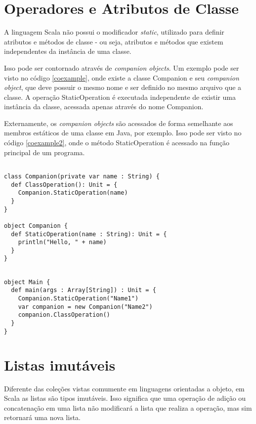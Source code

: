 \section{Operadores e Atributos de Classe}

A linguagem Scala não possui o modificador \textit{static}, 
utilizado para definir atributos e métodos de classe - 
ou seja, atributos e métodos que existem independentes 
da instância de uma classe. 

Isso pode ser contornado através de \textit{companion objects}. 
Um exemplo pode ser visto no código \ref{coexample}, onde 
existe a classe Companion e seu \textit{companion object}, que 
deve possuir o mesmo nome e ser definido no mesmo arquivo 
que a classe. A operação StaticOperation é executada 
independente de existir uma instância da classe, acessada 
apenas através do nome Companion.

Externamente, os \textit{companion objects} são acessados 
de forma semelhante aos membros estáticos de uma classe 
em Java, por exemplo. Isso pode ser visto no código 
\ref{coexample2}, onde o método StaticOperation é acessado 
na função principal de um programa.

\begin{lstlisting}[caption={Exemplo de companion object},label=coexample]

class Companion(private var name : String) {
  def ClassOperation(): Unit = {
    Companion.StaticOperation(name)
  }
}

object Companion {
  def StaticOperation(name : String): Unit = {
    println("Hello, " + name)
  }
}

\end{lstlisting}

\begin{lstlisting}[caption={Chamada de operações de um companion object},label=coexample2]

object Main {
  def main(args : Array[String]) : Unit = {
    Companion.StaticOperation("Name1")
    var companion = new Companion("Name2")
    companion.ClassOperation()
  }
}

\end{lstlisting}

\section{Listas imutáveis}

Diferente das coleções vistas comumente em linguagens 
orientadas a objeto, em Scala as listas são tipos 
imutáveis. Isso significa que uma operação de adição 
ou concatenação em uma lista não modificará a lista 
que realiza a operação, mas sim retornará uma nova 
lista\cite{ordesky2008}. 

